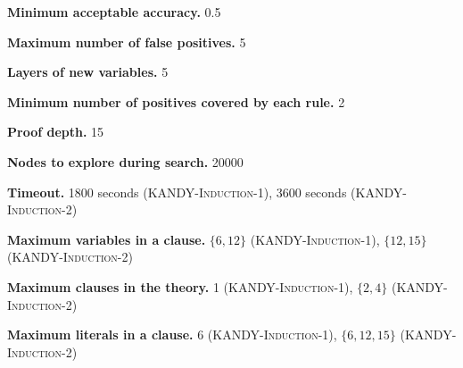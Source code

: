 \noindent\textbf{Minimum acceptable accuracy.} 0.5

\noindent\textbf{Maximum number of false positives.} 5

\noindent\textbf{Layers of new variables.} 5

\noindent\textbf{Minimum number of positives covered by each rule.} 2

\noindent\textbf{Proof depth.} 15

\noindent\textbf{Nodes to explore during search.} 20000

\noindent\textbf{Timeout.} 1800 seconds (\textsc{KANDY-Induction-1}), 3600 seconds (\textsc{KANDY-Induction-2})

\noindent\textbf{Maximum variables in a clause.} $\{6, 12\}$ (\textsc{KANDY-Induction-1}), $\{12, 15\}$ (\textsc{KANDY-Induction-2})

\noindent\textbf{Maximum clauses in the theory.} 1 (\textsc{KANDY-Induction-1}), $\{2, 4\}$ (\textsc{KANDY-Induction-2})

\noindent\textbf{Maximum literals in a clause.} 6 (\textsc{KANDY-Induction-1}), $\{6, 12, 15\}$ (\textsc{KANDY-Induction-2})